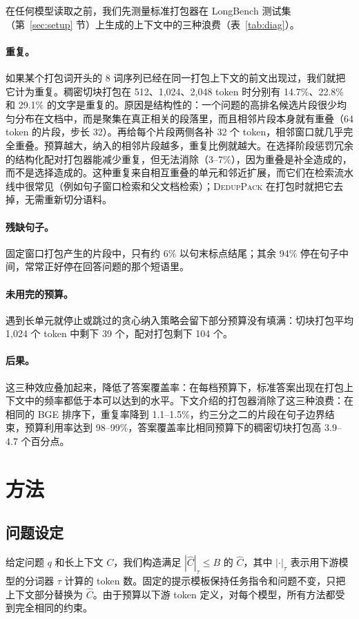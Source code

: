 \documentclass[11pt]{article}
\newcommand{\spk}{\textsc{DedupPack}}
\begin{document}
在任何模型读取之前，我们先测量标准打包器在 LongBench 测试集（第~\ref{sec:setup} 节）上生成的上下文中的三种浪费（表~\ref{tab:diag}）。

\paragraph{重复。}如果某个打包词开头的 8 词序列已经在同一打包上下文的前文出现过，我们就把它计为重复。稠密切块打包在 512、1,024、2,048 token 时分别有 14.7\%、22.8\% 和 29.1\% 的文字是重复的。原因是结构性的：一个问题的高排名候选片段很少均匀分布在文档中，而是聚集在真正相关的段落里，而且相邻片段本身就有重叠（64 token 的片段，步长 32）。再给每个片段两侧各补 32 个 token，相邻窗口就几乎完全重叠。预算越大，纳入的相邻片段越多，重复比例就越大。在选择阶段惩罚冗余的结构化配对打包器能减少重复，但无法消除（3--7\%），因为重叠是补全造成的，而不是选择造成的。这种重复来自相互重叠的单元和邻近扩展，而它们在检索流水线中很常见（例如句子窗口检索和父文档检索）；\spk{} 在打包时就把它去掉，无需重新切分语料。

\paragraph{残缺句子。}固定窗口打包产生的片段中，只有约 6\% 以句末标点结尾；其余 94\% 停在句子中间，常常正好停在回答问题的那个短语里。

\paragraph{未用完的预算。}遇到长单元就停止或跳过的贪心纳入策略会留下部分预算没有填满：切块打包平均 1,024 个 token 中剩下 39 个，配对打包剩下 104 个。

\paragraph{后果。}这三种效应叠加起来，降低了答案覆盖率：在每档预算下，标准答案出现在打包上下文中的频率都低于本可以达到的水平。下文介绍的打包器消除了这三种浪费：在相同的 BGE 排序下，重复率降到 1.1--1.5\%，约三分之二的片段在句子边界结束，预算利用率达到 98--99\%，答案覆盖率比相同预算下的稠密切块打包高 3.9--4.7 个百分点。

\section{方法}
\label{sec:method}

\subsection{问题设定}
给定问题 $q$ 和长上下文 $C$，我们构造满足 $|\hat C|_{\tau}\le B$ 的 $\hat C$，其中 $|\cdot|_{\tau}$ 表示用下游模型的分词器 $\tau$ 计算的 token 数。固定的提示模板保持任务指令和问题不变，只把上下文部分替换为 $\hat C$。由于预算以下游 token 定义，对每个模型，所有方法都受到完全相同的约束。
\end{document}
